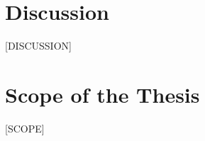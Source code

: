\documentclass{article}
\begin{document}
\section{Discussion}

[DISCUSSION]

%
\section{Scope of the Thesis}

[SCOPE]

%
\end{document}
